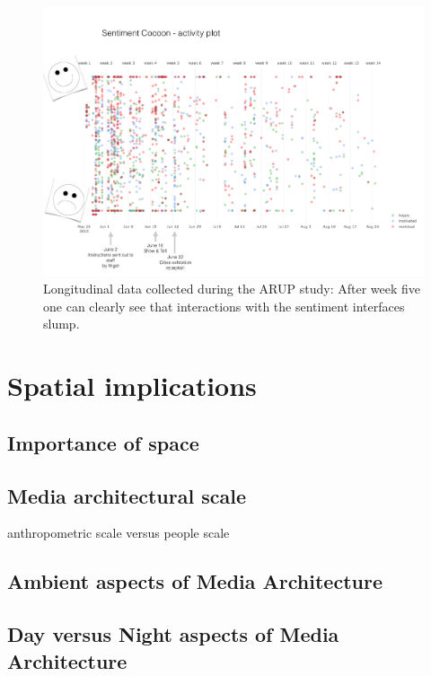 \begin{figure}[!h] 
\centering
\includegraphics[width=\textwidth]{Illustrations/Sentiment-Analysis.pdf}
\caption [Longitudinal aspects] {Longitudinal data collected during the ARUP study: After week five one can clearly see that interactions with the sentiment interfaces slump.	}
\label{ARUPanalysis}
\end{figure}

\section{Spatial implications}

\subsection{Importance of space}

\subsection{Media architectural scale}

anthropometric scale versus people scale

\subsection{Ambient aspects of Media Architecture}

\subsection{Day versus Night aspects of Media Architecture}

